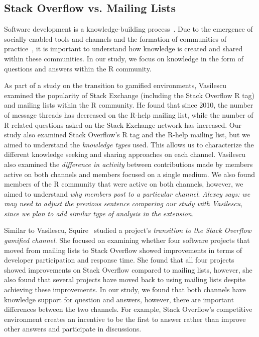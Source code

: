 \documentclass[smallextended]{svjour3}       %
\newcommand{\alexey}[1]{{\color{cyan}\emph{Alexey says: #1}}\xspace}
\newcommand{\alexey}[1]{}
\newcommand{\SO}{Stack Overflow\xspace}
\newcommand{\RH}{R-help\xspace}
\begin{document}
\subsection{\SO vs. Mailing Lists}
Software development is a knowledge-building process~\cite{naur1985programming}. Due to the emergence of socially-enabled tools and channels and the formation of communities of practice~\cite{Storey2014}, it is important to understand how knowledge is created and shared within these communities. In our study, we focus on knowledge in the form of questions and answers within the R community.


As part of a study on the transition to gamified environments, Vasilescu~\cite{Vasi1escu2014PhD} examined the popularity of Stack Exchange (including the \SO R tag) and
mailing lists within the R community. He found that since 2010, the number of message threads has decreased on the \RH mailing list, while the number of
R-related questions asked on the Stack Exchange network has increased. Our study also examined \SO's R tag and the \RH mailing list, but we aimed to understand the \textit{knowledge types} used. This allows us to characterize the different knowledge seeking and sharing approaches on each channel. Vasilescu also examined the \textit{difference in activity} between contributions made by members active on both channels and members focused on a single medium. We also found members of the R community that were active on both channels, however, we aimed to understand \textit{why members post to a particular channel}.
\alexey{we may need to adjust the previous sentence comparing our study with Vasilescu, since we plan to add similar type of analysis in the extension.}

Similar to Vasilescu, Squire~\cite{Squire2015a} studied a project's \textit{transition to the \SO gamified channel}. She focused on examining whether four software projects that moved from mailing lists to \SO showed improvements in terms of developer participation and response time. She found that all four projects showed improvements on \SO compared to mailing lists, however, she also found that several projects have moved back to using mailing lists despite achieving these improvements. In our study, we found that both channels have knowledge support for question and answers, however, there are important differences between the two channels. For example, \SO's competitive environment creates an incentive to be the first to answer rather than improve other answers and participate in discussions.
\end{document}
